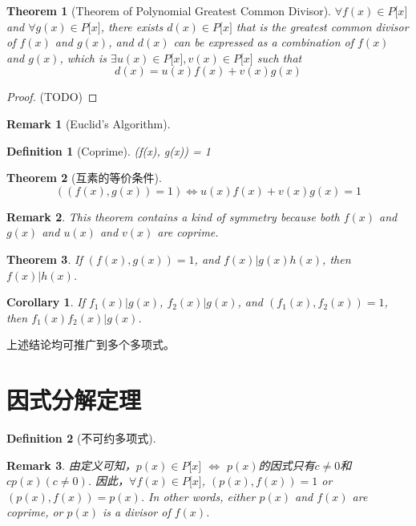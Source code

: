 \documentclass[onecolumn]{ctexart}
\newtheorem{definition}{Definition}
\newtheorem{theorem}{Theorem}
\newtheorem{corollary}{Corollary}
\newtheorem{remark}{Remark}
\begin{document}
\begin{theorem}[Theorem of Polynomial Greatest Common Divisor]
  $\forall f(x) \in P\lbrack x \rbrack$ and $\forall g(x) \in P\lbrack x \rbrack$, 
  there exists $d(x) \in P\lbrack x \rbrack$ that is the greatest common divisor 
  of $f(x)$ and $g(x)$, and $d(x)$ can be expressed as a combination of $f(x)$ 
  and $g(x)$, which is $\exists u(x) \in P\lbrack x \rbrack, v(x) \in P\lbrack x 
  \rbrack$ such that
  \[
    d(x) = u(x)f(x) + v(x)g(x)
  \]
\end{theorem}
\begin{proof}
  (TODO)
\end{proof}

\begin{remark}[Euclid's Algorithm]
  
\end{remark}

\begin{definition}[Coprime]
  (f(x), g(x)) = 1
\end{definition}

\begin{theorem}[互素的等价条件]
  \[
    ((f(x), g(x)) = 1) \Leftrightarrow u(x)f(x) + v(x)g(x) = 1
  \]
\end{theorem}
\begin{remark}
  This theorem contains a kind of symmetry because both $f(x)$ and $g(x)$ and $u(x)$ and $v(x)$ are coprime.
\end{remark}

\begin{theorem}
  If $(f(x), g(x)) = 1$, and $f(x) | g(x)h(x)$, then $f(x) | h(x)$.
\end{theorem}

\begin{corollary}
  If $f_1(x) | g(x)$, $f_2(x) | g(x)$, and $(f_1(x), f_2(x)) = 1$, then $f_1(x)f_2(x) | g(x)$.
\end{corollary}

上述结论均可推广到多个多项式。

\section{因式分解定理}
\begin{definition}[不可约多项式]
  
\end{definition}
\begin{remark}
  由定义可知，$p(x) \in P\lbrack x \rbrack$ $\Leftrightarrow$ $p(x)$的因式只有$c \neq 0$和
  $c p(x) (c \neq 0)$. 因此，$\forall f(x) \in P\lbrack x \rbrack$, $(p(x), f(x)) = 1$ or 
  $(p(x), f(x)) = p(x)$. In other words, either $p(x)$ and $f(x)$ are coprime, or $p(x)$ 
  is a divisor of $f(x)$.
\end{remark}
\end{document}

